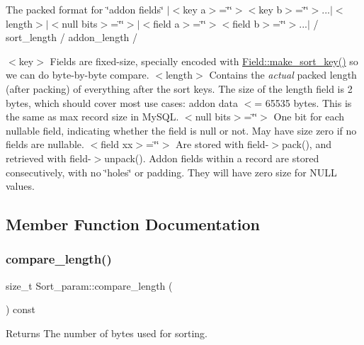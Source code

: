 The packed format for \char`\"{}addon fields\char`\"{} $\vert$$<$key a$>$=\char`\"{}\char`\"{}$>$$<$key b$>$=\char`\"{}\char`\"{}$>$...$\vert$$<$length$>$$\vert$$<$null bits$>$=\char`\"{}\char`\"{}$>$$\vert$$<$field a$>$=\char`\"{}\char`\"{}$>$$<$field b$>$=\char`\"{}\char`\"{}$>$...$\vert$ / sort\+\_\+length / addon\+\_\+length /

$<$key$>$ Fields are fixed-\/size, specially encoded with \mbox{\hyperlink{classField_af3bc27d237b6ae6ef3dc7a2aec3d79ac}{Field\+::make\+\_\+sort\+\_\+key()}} so we can do byte-\/by-\/byte compare. $<$length$>$ Contains the {\itshape actual} packed length (after packing) of everything after the sort keys. The size of the length field is 2 bytes, which should cover most use cases\+: addon data $<$= 65535 bytes. This is the same as max record size in My\+S\+QL. $<$null bits$>$=\char`\"{}\char`\"{}$>$ One bit for each nullable field, indicating whether the field is null or not. May have size zero if no fields are nullable. $<$field xx$>$=\char`\"{}\char`\"{}$>$ Are stored with field-\/$>$pack(), and retrieved with field-\/$>$unpack(). Addon fields within a record are stored consecutively, with no \char`\"{}holes\char`\"{} or padding. They will have zero size for N\+U\+LL values. 

\subsection{Member Function Documentation}
\mbox{\label{classSort__param_a6d29e4adf43d2a38309f862d4fe072f9}} 
\subsubsection{\texorpdfstring{compare\+\_\+length()}{compare\_length()}}
{\footnotesize\ttfamily size\+\_\+t Sort\+\_\+param\+::compare\+\_\+length (\begin{DoxyParamCaption}{ }\end{DoxyParamCaption}) const\hspace{0.3cm}{\ttfamily [inline]}}

\begin{DoxyReturn}{Returns}
The number of bytes used for sorting. 
\end{DoxyReturn}
\mbox{\label{classSort__param_ab163236156a4c13ec6578d7813b50c8e}} 
